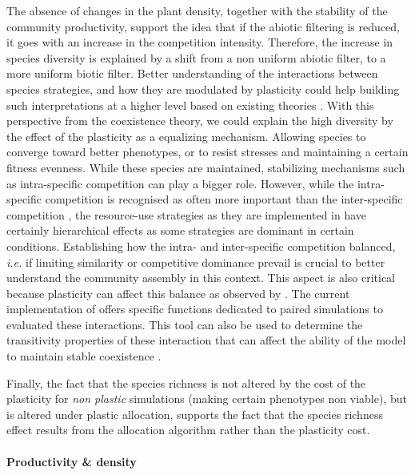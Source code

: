 The absence of changes in the plant density, together with the stability of the community productivity, support the idea that if the abiotic filtering is reduced, it goes with an increase in the competition intensity. Therefore, the increase in species diversity is explained by a shift from a non uniform abiotic filter, to a more uniform biotic filter. Better understanding of the interactions between species strategies, and how they are modulated by plasticity could help building such interpretations at a higher level based on existing theories \parencite{chesson_mechanisms_2000}. 
With this perspective from the coexistence theory, we could explain the high diversity by the effect of the plasticity as a equalizing mechanism. Allowing species to converge toward better phenotypes, or to resist stresses and maintaining a certain fitness evenness. While these species are maintained, stabilizing mechanisms such as intra-specific competition can play a bigger role. However, while the intra-specific competition is recognised as often more important than the inter-specific competition \parencite{macarthur_limiting_1967}, the resource-use strategies as they are implemented in \model have certainly hierarchical effects \parencite{kunstler_plant_2016} as some strategies are dominant in certain conditions. Establishing how the intra- and inter-specific competition balanced, \textit{i.e.} if limiting similarity or competitive dominance prevail is crucial to better understand the community assembly in this context. This aspect is also critical because plasticity can affect this balance as observed by \cite{bennett_reciprocal_2016}. The current implementation of \model offers specific functions dedicated to paired simulations to evaluated these interactions. This tool can also be used to determine the transitivity properties of these interaction that can affect the ability of the model to maintain stable coexistence \parencite{levine_beyond_2017}. 


Finally, the fact that the species richness is not altered by the cost of the plasticity for \textit{non plastic} simulations (making certain phenotypes non viable), but is altered under plastic allocation, supports the fact that the species richness effect results from the allocation algorithm rather than the plasticity cost.


\paragraph{Productivity \& density}

